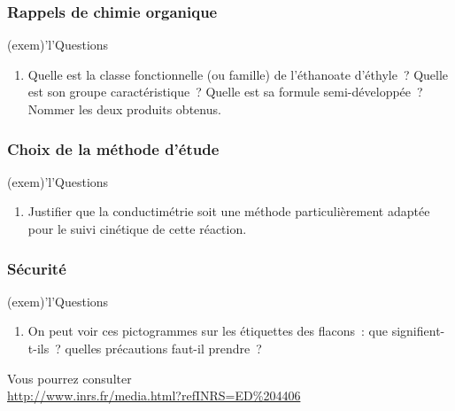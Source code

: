 \documentclass[../main/main.tex]{subfiles}
\begin{document}
\subsubsection{Rappels de chimie organique}

\vspace{-10pt}
\begin{tcb}(exem)'l'{\tiny Questions}
	\begin{enumerate}[label*=\sqenumi]
		\item Quelle est la classe fonctionnelle (ou famille) de l'éthanoate
		      d'éthyle~? Quelle est son groupe caractéristique~? Quelle est sa formule
		      semi-développée~? Nommer les deux produits obtenus.
	\end{enumerate}
\end{tcb}

\vspace{-10pt}
\subsubsection{Choix de la méthode d'étude}

\vspace{-10pt}
\begin{tcb}(exem)'l'{\tiny Questions}
	\begin{enumerate}[label*=\sqenumi, start=2]
		\item Justifier que la conductimétrie soit une méthode particulièrement
		      adaptée pour le suivi cinétique de cette réaction.
	\end{enumerate}
\end{tcb}

\vspace{-10pt}
\subsubsection{Sécurité}

\vspace{-10pt}
\begin{tcb}(exem)'l'{Questions}
	\begin{minipage}{0.55\linewidth}
		\begin{enumerate}[label=\sqenumi, start=3]
			\item On peut voir ces pictogrammes sur les étiquettes des flacons~: que
			      signifient-t-ils~? quelles précautions faut-il prendre~?
		\end{enumerate}
		Vous pourrez consulter\\
		\url{http://www.inrs.fr/media.html?refINRS=ED%204406}
	\end{minipage}
	\hfill
	\begin{minipage}{0.40\linewidth}
	\end{minipage}
\end{tcb}
\end{document}
